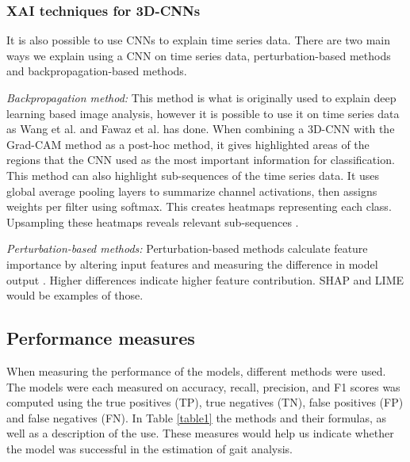 \documentclass[UKenglish]{uiomasterthesis}
\begin{document}
\subsubsection{XAI techniques for 3D-CNNs}
It is also possible to use CNNs to explain time series data. There are two main ways we explain using a CNN on time series data, perturbation-based methods and backpropagation-based methods. 

\textit{Backpropagation method: } This method is what is originally used to explain deep learning based image analysis, however it is possible to use it on time series data as Wang et al.\cite{wang_time_2016} and Fawaz et al.\cite{fawaz_evaluating_2018} has done. When combining a 3D-CNN with the Grad-CAM method as a post-hoc method, it gives highlighted areas of the regions that the CNN used as the most important information for classification. This method can also highlight sub-sequences of the time series data. It uses global average pooling layers to summarize channel activations, then assigns weights per filter using softmax. This creates heatmaps representing each class. Upsampling these heatmaps reveals relevant sub-sequences \cite{rojat_explainable_2021}.

\textit{Perturbation-based methods:} Perturbation-based methods calculate feature importance by altering input features and measuring the difference in model output \cite{ancona_towards_2018}. Higher differences indicate higher feature contribution. SHAP and LIME would be examples of those. 

\subsection{Performance measures}
When measuring the performance of the models, different methods were used. The models were each measured on accuracy, recall, precision, and F1 scores was computed using the true positives (TP), true negatives (TN), false positives (FP) and false negatives (FN). In Table \ref{table1} the methods and their formulas, as well as a description of the use. These measures would help us indicate whether the model was successful in the estimation of gait analysis. 
\end{document}
